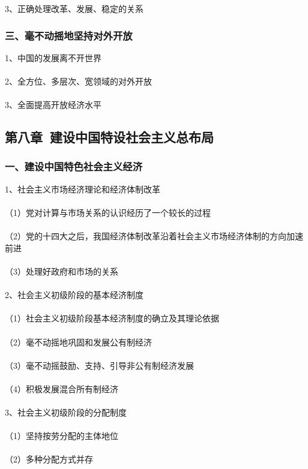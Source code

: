 \documentclass{ctexart}
\begin{document}
3、正确处理改革、发展、稳定的关系

\subsubsection{三、毫不动摇地坚持对外开放}
1、中国的发展离不开世界
\\\\

2、全方位、多层次、宽领域的对外开放
\\\\

3、全面提高开放经济水平



\subsection{第八章\ 建设中国特设社会主义总布局}
\subsubsection{一、建设中国特色社会主义经济}
1、社会主义市场经济理论和经济体制改革
\\\\
（1）党对计算与市场关系的认识经历了一个较长的过程
\\\\
（2）党的十四大之后，我国经济体制改革沿着社会主义市场经济体制的方向加速前进
\\\\
（3）处理好政府和市场的关系
\\\\

2、社会主义初级阶段的基本经济制度
\\\\
（1）社会主义初级阶段基本经济制度的确立及其理论依据
\\\\
（2）毫不动摇地巩固和发展公有制经济
\\\\
（3）毫不动摇鼓励、支持、引导非公有制经济发展
\\\\
（4）积极发展混合所有制经济
\\\\

3、社会主义初级阶段的分配制度
\\\\
（1）坚持按劳分配的主体地位
\\\\
（2）多种分配方式并存
\\\\
\end{document}
